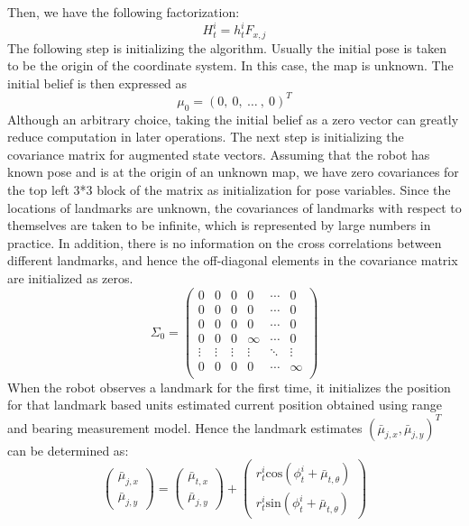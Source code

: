 Then, we have the following factorization: 
\begin{equation}
    H^{i}_{t} = h^{i}_{t} F_{x,j}
\end{equation}
The following step is initializing the algorithm. Usually the initial pose is taken to be the origin of the
coordinate system. In this case, the map is unknown. The initial belief is then expressed as
\begin{equation}
\mu_{0} = (0, \ 0, \ \dots \ , \ 0)^{T}    
\end{equation}
Although an arbitrary choice, taking the initial belief as a zero vector can greatly reduce computation in later operations. The next step is initializing the covariance matrix for augmented state vectors. Assuming that the robot has known pose and is at the origin of an unknown map, we have zero covariances for the top left 3*3
block of the matrix as initialization for pose variables. Since the locations of landmarks are unknown, the covariances of landmarks with respect to themselves are taken to be infinite, which is represented by large numbers in practice. In addition, there is no information on the cross correlations between different landmarks, and hence the off-diagonal elements in the covariance matrix are initialized as zeros.
\begin{equation}
    \Sigma_{0} = \begin{pmatrix}
    0 & 0 & 0 & 0 & \cdots & 0 \\
    0 & 0 & 0 & 0 & \cdots & 0 \\
    0 & 0 & 0 & 0 & \cdots & 0 \\
    0 & 0 & 0 & \infty & \cdots & 0 \\
    \vdots & \vdots & \vdots & \vdots & \ddots & \vdots \\
    0 & 0 & 0 & 0 & \cdots & \infty \\
    \end{pmatrix}
\end{equation}
When the robot observes a landmark for the first time, it initializes the position for that landmark based units estimated current position obtained using range and bearing measurement model. Hence the landmark estimates $(\bar{\mu}_{j,x},\bar{\mu}_{j,y})^{T}$ can be determined as:
\begin{equation}
    \begin{pmatrix}
    \bar{\mu}_{j,x} \\
    \bar{\mu}_{j,y}
    \end{pmatrix}
    = \begin{pmatrix}
    \bar{\mu}_{t,x}\\
    \bar{\mu}_{j,y}
    \end{pmatrix}
    +
    \begin{pmatrix}
    r^{i}_{t}\text{cos}(\phi^{i}_{t} + \bar{\mu}_{t,\theta}) \\
    r^{i}_{t}\text{sin}(\phi^{i}_{t} + \bar{\mu}_{t,\theta})
    \end{pmatrix}
\end{equation}
